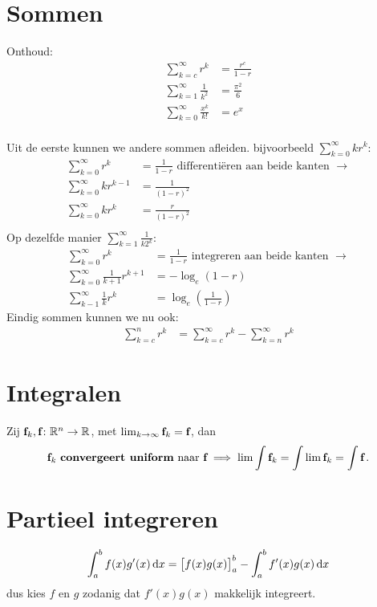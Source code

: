 \documentclass{article}
\begin{document}
	\tableofcontents
	\section{Sommen}
 		Onthoud:
 		\begin{align*}
 			\sum_{k=c}^{\infty} r^k &= \frac{r^c}{1-r} \\
 			\sum_{k=1}^{\infty} \frac{1}{k^2} &= \frac{\pi^2}{6} \\
 			\sum_{k=0}^\infty \frac{x^k}{k!} &= e^x \\
 		\end{align*}
 		
 		Uit de eerste kunnen we andere sommen afleiden. bijvoorbeeld 
 		$\displaystyle \sum_{k=0}^{\infty} kr^k: $
 		\begin{align*}
 				\sum_{k=0}^{\infty} r^k &= \frac{1}{1-r} \text { differenti\"eren aan beide kanten } \to \\
 				\sum_{k=0}^{\infty} kr^{k-1} &= \frac{1}{(1-r)^2} \\
 				\sum_{k=0}^{\infty} kr^k &= \frac{r}{(1-r)^2} \\
 		\end{align*}
 		Op dezelfde manier $\displaystyle \sum_{k=1}^{\infty} \frac{1}{k2^k}$:
 		\begin{align*}
 				\sum_{k=0}^{\infty} r^k &= \frac{1}{1-r} \text { integreren aan beide kanten } \to \\
 				\sum_{k=0}^{\infty} \frac{1}{k+1} r^{k+1} &= -\log_e (1-r) \\
 				\sum_{k-1}^\infty \frac{1}{k} r^k &= \log_e (\frac{1}{1-r})
 		\end{align*}
 		Eindig sommen kunnen we nu ook:
 		\begin{align*}
 			\sum_{k=c}^n r^k &= \sum_{k=c}^\infty r^k - \sum_{k=n}^\infty r^k
 		\end{align*}
 		
 	\section{Integralen}
	 	\begin{stelling}
		 	Zij ${\textbf{f}}_k,{\textbf{f}} \colon \mathbb{R}^n \to \mathbb{R}$, met $\lim_{k \to \infty} {\textbf{f}}_k = {\textbf{f}}$, dan
		 	\[ {\textbf{f}}_k \text { \textbf{convergeert uniform} naar } {\textbf{f}} \implies \lim \int {\textbf{f}}_k = \int \lim {\textbf{f}}_k = \int {\textbf{f}} \,. \]
	 	\end{stelling}
	 	
	\section{Partieel integreren}
		\[ 
			\int_a^b f(x) g'(x) \mathop{}\!\mathrm{d} x = \big[f(x)g(x)\big]_a^b - \int_a^b f'(x) g(x) \mathop{}\!\mathrm{d} x
		 \]
		 dus kies $f$ en $g$ zodanig dat $f'(x)g(x)$ makkelijk integreert.
 			 
\end{document}
